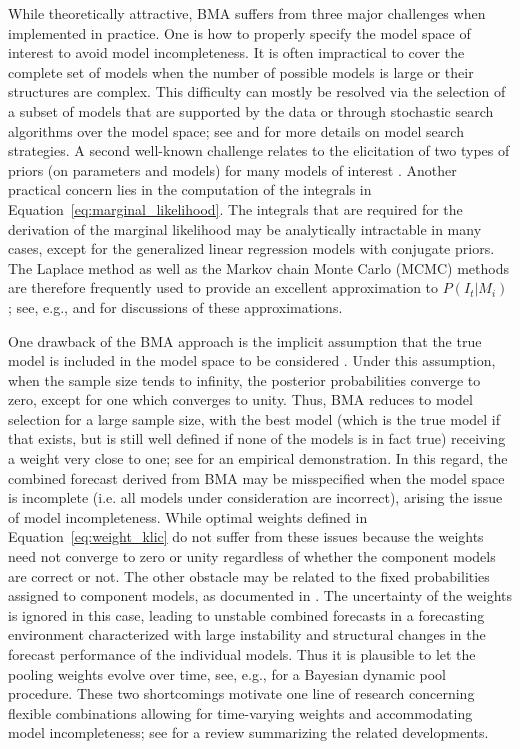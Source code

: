 \documentclass[11pt]{article}
\begin{document}
While theoretically attractive, BMA suffers from three major challenges when implemented in practice. One is how to properly specify the model space of interest to avoid model incompleteness. It is often impractical to cover the complete set of models when the number of possible models is large or their structures are complex. This difficulty can mostly be resolved via the selection of a subset of models that are supported by the data or through stochastic search algorithms over the model space; see \citet{Hoeting1999-qn} and \citet{Koop2003-nl} for more details on model search strategies. A second well-known challenge relates to the elicitation of two types of priors (on parameters and models) for many models of interest \citep{Moral-Benito2015-zh,Aastveit2018-lf}. Another practical concern lies in the computation of the integrals in Equation~\eqref{eq:marginal_likelihood}. The integrals that are required for the derivation of the marginal likelihood may be analytically intractable in many cases, except for the generalized linear regression models with conjugate priors. The Laplace method as well as the Markov chain Monte Carlo (MCMC) methods are therefore frequently used to provide an excellent approximation to $P(I_{t}|M_{i})$; see, e.g., \citet{Hoeting1999-qn} and \citet{Bassetti2020-uh} for discussions of these approximations.

One drawback of the BMA approach is the implicit assumption that the true model is included in the model space to be considered \citep{Wright2008-bs}. Under this assumption, when the sample size tends to infinity, the posterior probabilities converge to zero, except for one which converges to unity. Thus, BMA reduces to model selection for a large sample size, with the best model (which is the true model if that exists, but is still well defined if none of the models is in fact true) receiving a weight very close to one; see \citet{Geweke2010-zn} for an empirical demonstration. In this regard, the combined forecast derived from BMA may be misspecified when the model space is incomplete (i.e. all models under consideration are incorrect), arising the issue of model incompleteness. While optimal weights defined in Equation~\eqref{eq:weight_klic} do not suffer from these issues because the weights need not converge to zero or unity regardless of whether the component models are correct or not. The other obstacle may be related to the fixed probabilities assigned to component models, as documented in \citet{Aastveit2018-lf}. The uncertainty of the weights is ignored in this case, leading to unstable combined forecasts in a forecasting environment characterized with large instability and structural changes in the forecast performance of the individual models. Thus it is plausible to let the pooling weights evolve over time, see, e.g., \citet{Del_Negro2016-ab} for a Bayesian dynamic pool procedure. These two shortcomings motivate one line of research concerning flexible combinations allowing for time-varying weights and accommodating model incompleteness; see \citet{Aastveit2018-lf} for a review summarizing the related developments.
\end{document}
